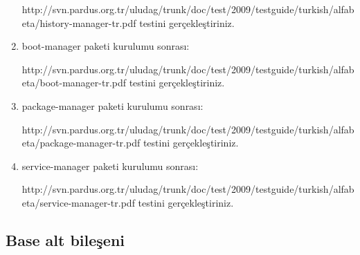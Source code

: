 \documentclass[a4paper,10pt]{article}
\begin{document}
\begin{enumerate}
 http://svn.pardus.org.tr/uludag/trunk/doc/test/2009/testguide/turkish/alfabeta/history-manager-tr.pdf  testini gerçekleştiriniz.

\item boot-manager paketi kurulumu sonrası:

 http://svn.pardus.org.tr/uludag/trunk/doc/test/2009/testguide/turkish/alfabeta/boot-manager-tr.pdf  testini gerçekleştiriniz.


\item package-manager paketi kurulumu sonrası:

http://svn.pardus.org.tr/uludag/trunk/doc/test/2009/testguide/turkish/alfabeta/package-manager-tr.pdf  testini gerçekleştiriniz.

\item service-manager paketi kurulumu sonrası:

http://svn.pardus.org.tr/uludag/trunk/doc/test/2009/testguide/turkish/alfabeta/service-manager-tr.pdf  testini gerçekleştiriniz.

\end{enumerate}

\subsection*{Base alt bileşeni}
\end{document}
